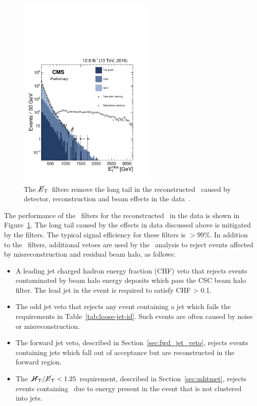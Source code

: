 \begin{figure}
\centering
    \includegraphics[width=0.6\textwidth]{./Figures/alphat/met_clean}
  \caption{\label{fig:met_filter} The $\mbox{$\cancel{E}_\text{T}$}$~filters remove the long tail in the reconstructed \met~caused by detector, reconstruction
  and beam effects in the data~\cite{met_fig}.} 
\end{figure}
The performance of the \met~filters for the reconstructed \met~in the data is shown in Figure~\ref{fig:met_filter}. The long tail caused by
the effects in data discussed above is mitigated by the filters. The typical signal efficiency for these filters
is $> 99\%$. In addition to the \met~filters, additional vetoes are used by 
the \alphat~analysis to reject events affected by misreconstruction and residual beam halo, as follows:
\begin{itemize}
\item A leading jet charged hadron energy fraction (CHF) veto that rejects events 
contaminated by beam halo energy deposits which pass the CSC beam halo filter. The lead jet 
in the event is required to satisfy CHF > 0.1.
\item The odd jet veto that rejects any event containing a jet which fails the 
requirements in Table~\ref{tab:loose-jet-id}. Such events are often caused by noise or misreconstruction.
\item The forward jet veto, described in Section~\ref{sec:fwd_jet_veto}, rejects events containing jets which fall out of acceptance but
are reconstructed in the forward region. 
\item The $\mbox{$\mbox{$\,\cancel{H}_{\rm T}$} / \mbox{$\cancel{E}_\text{T}$}$} < 1.25$ requirement, described in Section~\ref{sec:mhtmet}, rejects events containing 
\mht~due to energy present in the event that is not clustered into jets. 
\end{itemize}

